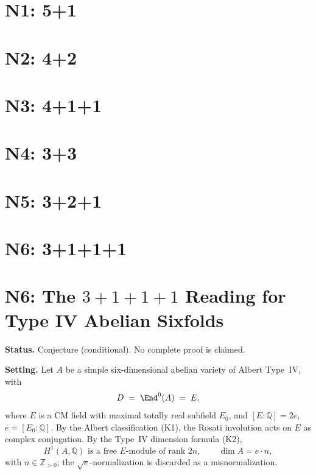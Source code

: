 \documentclass{article}
\begin{document}
\section{N1: 5+1}

\section{N2: 4+2}

\section{N3: 4+1+1}

\section{N4: 3+3}

\section{N5: 3+2+1}

\section{N6: 3+1+1+1}
\section*{N6: The \(3+1+1+1\) Reading for Type IV Abelian Sixfolds}

\medskip
\noindent\textbf{Status.} Conjecture (conditional). No complete proof is claimed.

\medskip
\noindent\textbf{Setting.} Let \(A\) be a simple six-dimensional abelian variety of Albert Type~IV, with
\[
D \;=\; \End^{0}(A) \;=\; E,
\]
where \(E\) is a CM field with maximal totally real subfield \(E_{0}\), and \([E:\mathbb{Q}] = 2e\), \(e = [E_{0}:\mathbb{Q}]\). By the Albert classification (K1), the Rosati involution acts on \(E\) as complex conjugation. By the Type~IV dimension formula (K2),
\[
H^{1}(A,\mathbb{Q}) \text{ is a free } E\text{-module of rank } 2n,\qquad \dim A = e\cdot n,
\]
with \(n\in\mathbb{Z}_{>0}\); the \(\sqrt{e}\)-normalization is discarded as a misnormalization.
\end{document}
